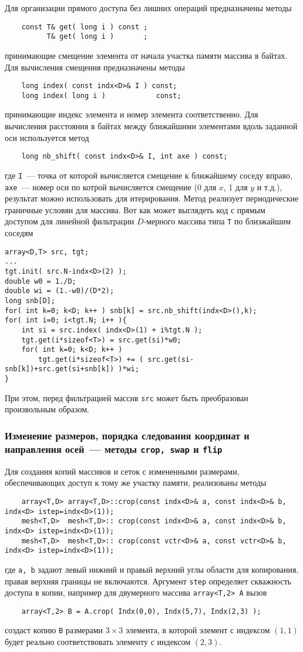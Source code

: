 Для организации прямого доступа без лишних операций предназначены методы
\begin{verbatim}
    const T& get( long i ) const ;
          T& get( long i )       ;
\end{verbatim}
принимающие смещение элемента от начала участка памяти массива в байтах. 
Для вычисления смещения предназначены методы
\begin{verbatim}
    long index( const indx<D>& I ) const;
    long index( long i )            const;
\end{verbatim}
принимающие индекс элемента и номер элемента соответственно. Для вычисления
расстояния в байтах между ближайшими элементами вдоль заданной оси
используется метод
\begin{verbatim}
    long nb_shift( const indx<D>& I, int axe ) const;
\end{verbatim}
где {\tt I}~--- точка от которой вычисляется смещение к ближайшему соседу
вправо, 
{\tt axe}~--- номер оси по котрой вычисляется смещение (0 для $x$, 1 для $y$ и т.д.), результат можно
использовать для итерирования. Метод реализует периодические граничные условяи
для массива. Вот как может выглядеть код с прямым доступом
для линейной фильтрации $D$-мерного массива типа {\tt T} по близжайшим соседям
\begin{verbatim}
array<D,T> src, tgt;
...
tgt.init( src.N-indx<D>(2) );
double w0 = 1./D; 
double wi = (1.-w0)/(D*2);
long snb[D];
for( int k=0; k<D; k++ ) snb[k] = src.nb_shift(indx<D>(),k);
for( int i=0; i<tgt.N; i++ ){
    int si = src.index( indx<D>(1) + i%tgt.N );
    tgt.get(i*sizeof<T>) = src.get(si)*w0;
    for( int k=0; k<D; k++ ) 
        tgt.get(i*sizeof<T>) += ( src.get(si-snb[k])+src.get(si+snb[k]) )*wi;
}
\end{verbatim}
При этом, перед фильтрацией массив {\tt src} может быть преобразован
произвольным образом.

\subsubsection{Изменение размеров, порядка следования координат и направления
  осей~--- методы {\tt crop, swap} и {\tt flip}}
Для создания копий массивов и сеток с измененными размерами, обеспечивающих доступ к тому же
участку памяти, реализованы методы 
\begin{verbatim}
    array<T,D> array<T,D>::crop(const indx<D>& a, const indx<D>& b, indx<D> istep=indx<D>(1));
    mesh<T,D>  mesh<T,D>:: crop(const indx<D>& a, const indx<D>& b, indx<D> istep=indx<D>(1));
    mesh<T,D>  mesh<T,D>:: crop(const vctr<D>& a, const vctr<D>& b, indx<D> istep=indx<D>(1));
\end{verbatim}
где {\tt a, b}
задают левый нижний и правый верхний углы области для копирования, правая
верхняя границы не включаются. Аргумент {\tt step} определяет скважность
доступа в копии, например для двумерного  массива {\tt array<T,2> A} вызов 
\begin{verbatim}
    array<T,2> B = A.crop( Indx(0,0), Indx(5,7), Indx(2,3) );
\end{verbatim}
создаст копию {\tt B} размерами $3\times3$ элемента, в которой элемент с индексом
$(1,1)$ будет реально соответствовать элементу с индексом $(2,3)$.

